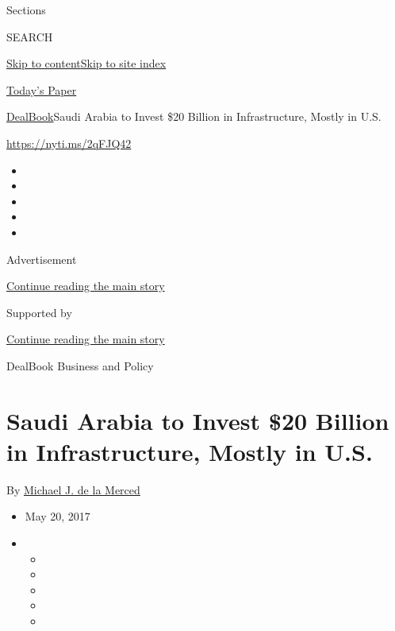 Sections

SEARCH

\protect\hyperlink{site-content}{Skip to
content}\protect\hyperlink{site-index}{Skip to site index}

\href{https://myaccount.nytimes3xbfgragh.onion/auth/login?response_type=cookie\&client_id=vi}{}

\href{https://www.nytimes3xbfgragh.onion/section/todayspaper}{Today's
Paper}

\href{/section/business/dealbook}{DealBook}\textbar{}Saudi Arabia to
Invest \$20 Billion in Infrastructure, Mostly in U.S.

\url{https://nyti.ms/2qFJQ42}

\begin{itemize}
\item
\item
\item
\item
\item
\end{itemize}

Advertisement

\protect\hyperlink{after-top}{Continue reading the main story}

Supported by

\protect\hyperlink{after-sponsor}{Continue reading the main story}

DealBook Business and Policy

\hypertarget{saudi-arabia-to-invest-20-billion-in-infrastructure-mostly-in-us}{%
\section{Saudi Arabia to Invest \$20 Billion in Infrastructure, Mostly
in
U.S.}\label{saudi-arabia-to-invest-20-billion-in-infrastructure-mostly-in-us}}

By
\href{http://www.nytimes3xbfgragh.onion/by/michael-j-de-la-merced}{Michael
J. de la Merced}

\begin{itemize}
\item
  May 20, 2017
\item
  \begin{itemize}
  \item
  \item
  \item
  \item
  \item
  \end{itemize}
\end{itemize}

